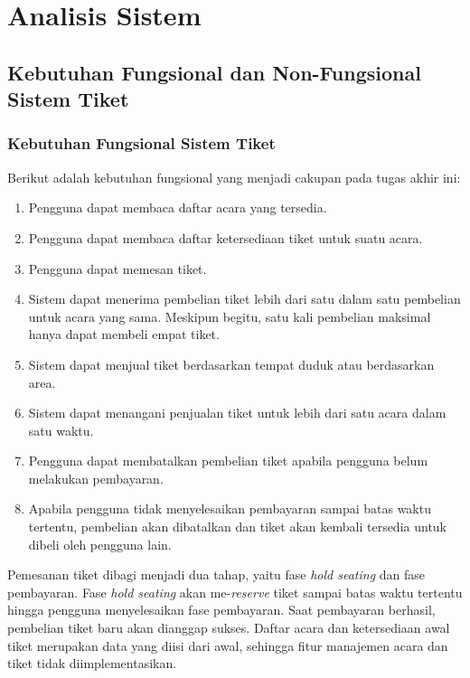 \chapter{Analisis Sistem}

\section{Kebutuhan Fungsional dan Non-Fungsional Sistem Tiket}

\subsection{Kebutuhan Fungsional Sistem Tiket}

Berikut adalah kebutuhan fungsional yang menjadi cakupan pada tugas akhir ini:

\begin{enumerate}
    \item Pengguna dapat membaca daftar acara yang tersedia.
    \item Pengguna dapat membaca daftar ketersediaan tiket untuk suatu acara.
    \item Pengguna dapat memesan tiket.
    \item Sistem dapat menerima pembelian tiket lebih dari satu dalam satu pembelian untuk acara yang sama. Meskipun begitu, satu kali pembelian maksimal hanya dapat membeli empat tiket.
    \item Sistem dapat menjual tiket berdasarkan tempat duduk atau berdasarkan area.
    \item Sistem dapat menangani penjualan tiket untuk lebih dari satu acara dalam satu waktu.
    \item Pengguna dapat membatalkan pembelian tiket apabila pengguna belum melakukan pembayaran.
    \item Apabila pengguna tidak menyelesaikan pembayaran sampai batas waktu tertentu, pembelian akan dibatalkan dan tiket akan kembali tersedia untuk dibeli oleh pengguna lain.
\end{enumerate}

Pemesanan tiket dibagi menjadi dua tahap, yaitu fase \textit{hold seating} dan fase pembayaran. Fase \textit{hold seating} akan me-\textit{reserve} tiket sampai batas waktu tertentu hingga pengguna menyelesaikan fase pembayaran. Saat pembayaran berhasil, pembelian tiket baru akan dianggap sukses. Daftar acara dan ketersediaan awal tiket merupakan data yang diisi dari awal, sehingga fitur manajemen acara dan tiket tidak diimplementasikan.

